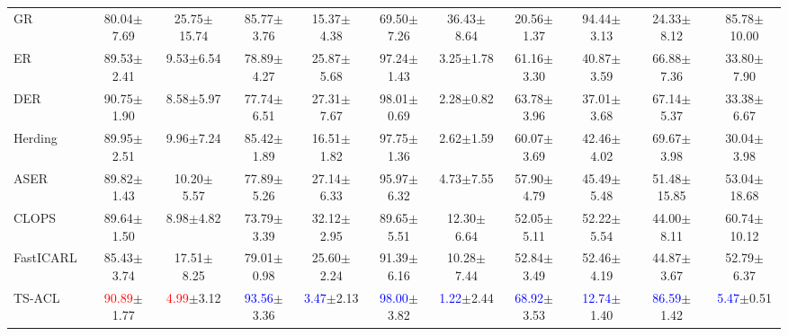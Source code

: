 \begin{table}[!htbp]
{\begin{NiceTabular}{lcccccccccc}
        \midrule
        GR~\citep{shin2017continual} & 80.04{\tiny $\pm$7.69} & 25.75{\tiny $\pm$15.74} & 85.77{\tiny $\pm$3.76} & 15.37{\tiny $\pm$4.38} & 69.50{\tiny $\pm$7.26} & 36.43{\tiny $\pm$8.64} & 20.56{\tiny $\pm$1.37} & 94.44{\tiny $\pm$3.13} & 24.33{\tiny $\pm$8.12} & 85.78{\tiny $\pm$10.00} \\
        ER~\citep{rolnick2019experience} & 89.53{\tiny $\pm$2.41} & 9.53{\tiny $\pm$6.54} & 78.89{\tiny $\pm$4.27} & 25.87{\tiny $\pm$5.68} & 97.24{\tiny $\pm$1.43} & 3.25{\tiny $\pm$1.78} & 61.16{\tiny $\pm$3.30} & 40.87{\tiny $\pm$3.59} & 66.88{\tiny $\pm$7.36} & 33.80{\tiny $\pm$7.90} \\
        DER~\citep{buzzega2020dark} & 90.75{\tiny $\pm$1.90} & 8.58{\tiny $\pm$5.97} & 77.74{\tiny $\pm$6.51} & 27.31{\tiny $\pm$7.67} & 98.01{\tiny $\pm$0.69} & 2.28{\tiny $\pm$0.82} & 63.78{\tiny $\pm$3.96} & 37.01{\tiny $\pm$3.68} & 67.14{\tiny $\pm$5.37} & 33.38{\tiny $\pm$6.67} \\
        Herding~\citep{welling2009herding} & 89.95{\tiny $\pm$2.51} & 9.96{\tiny $\pm$7.24} & 85.42{\tiny $\pm$1.89} & 16.51{\tiny $\pm$1.82} & 97.75{\tiny $\pm$1.36} & 2.62{\tiny $\pm$1.59} & 60.07{\tiny $\pm$3.69} & 42.46{\tiny $\pm$4.02} & 69.67{\tiny $\pm$3.98} & 30.04{\tiny $\pm$3.98} \\
        ASER~\citep{ASER} & 89.82{\tiny $\pm$1.43} & 10.20{\tiny $\pm$5.57} & 77.89{\tiny $\pm$5.26} & 27.14{\tiny $\pm$6.33} & 95.97{\tiny $\pm$6.32} & 4.73{\tiny $\pm$7.55} & 57.90{\tiny $\pm$4.79} & 45.49{\tiny $\pm$5.48} & 51.48{\tiny $\pm$15.85} & 53.04{\tiny $\pm$18.68} \\
        CLOPS~\citep{CLOPS} & 89.64{\tiny $\pm$1.50} & 8.98{\tiny $\pm$4.82} & 73.79{\tiny $\pm$3.39} & 32.12{\tiny $\pm$2.95} & 89.65{\tiny $\pm$5.51} & 12.30{\tiny $\pm$6.64} & 52.05{\tiny $\pm$5.11} & 52.22{\tiny $\pm$5.54} & 44.00{\tiny $\pm$8.11} & 60.74{\tiny $\pm$10.12} \\
        FastICARL~\citep{FASTICARL} & 85.43{\tiny $\pm$3.74} & 17.51{\tiny $\pm$8.25} & 79.01{\tiny $\pm$0.98} & 25.60{\tiny $\pm$2.24} & 91.39{\tiny $\pm$6.16} & 10.28{\tiny $\pm$7.44} & 52.84{\tiny $\pm$3.49} & 52.46{\tiny $\pm$4.19} & 44.87{\tiny $\pm$3.67} & 52.79{\tiny $\pm$6.37} \\
        \midrule
        TS-ACL & \textcolor{red}{90.89}{\tiny $\pm$1.77} & \textcolor{red}{4.99}{\tiny $\pm$3.12} & \textcolor{blue}{93.56}{\tiny $\pm$3.36} & \textcolor{blue}{3.47}{\tiny $\pm$2.13} & \textcolor{blue}{98.00}{\tiny $\pm$3.82} & \textcolor{blue}{1.22}{\tiny $\pm$2.44} & \textcolor{blue}{68.92}{\tiny $\pm$3.53} & \textcolor{blue}{12.74}{\tiny $\pm$1.40} & \textcolor{blue}{86.59}{\tiny $\pm$1.42} & \textcolor{blue}{5.47}{\tiny $\pm$0.51} \\

\end{NiceTabular}}
\end{table}
